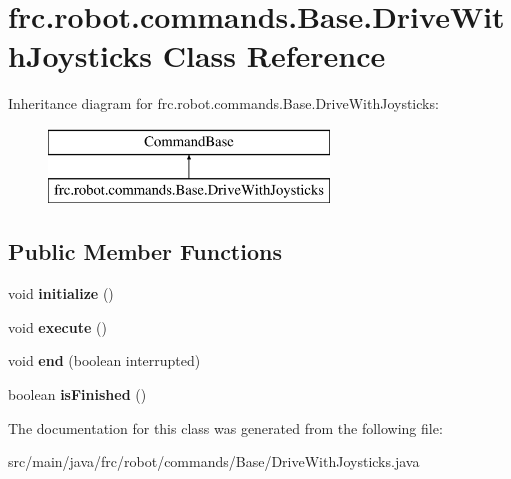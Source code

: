 \hypertarget{classfrc_1_1robot_1_1commands_1_1_base_1_1_drive_with_joysticks}{}\section{frc.\+robot.\+commands.\+Base.\+Drive\+With\+Joysticks Class Reference}
\label{classfrc_1_1robot_1_1commands_1_1_base_1_1_drive_with_joysticks}
Inheritance diagram for frc.\+robot.\+commands.\+Base.\+Drive\+With\+Joysticks\+:\begin{figure}[H]
\begin{center}
\leavevmode
\includegraphics[height=2.000000cm]{classfrc_1_1robot_1_1commands_1_1_base_1_1_drive_with_joysticks}
\end{center}
\end{figure}
\subsection*{Public Member Functions}
\begin{DoxyCompactItemize}
\item 
\mbox{\label{classfrc_1_1robot_1_1commands_1_1_base_1_1_drive_with_joysticks_a9b64d3c7eafc9b3065a10aabf6b96bb6}} 
void {\bfseries initialize} ()
\item 
\mbox{\label{classfrc_1_1robot_1_1commands_1_1_base_1_1_drive_with_joysticks_adbcbc73ac1015f6f72a810d89cf93ddc}} 
void {\bfseries execute} ()
\item 
\mbox{\label{classfrc_1_1robot_1_1commands_1_1_base_1_1_drive_with_joysticks_ab7633716b39bce6243d5c7c9b7dbb32f}} 
void {\bfseries end} (boolean interrupted)
\item 
\mbox{\label{classfrc_1_1robot_1_1commands_1_1_base_1_1_drive_with_joysticks_add7cfa94f3b73b65f94ac6739febb34f}} 
boolean {\bfseries is\+Finished} ()
\end{DoxyCompactItemize}


The documentation for this class was generated from the following file\+:\begin{DoxyCompactItemize}
\item 
src/main/java/frc/robot/commands/\+Base/Drive\+With\+Joysticks.\+java\end{DoxyCompactItemize}
